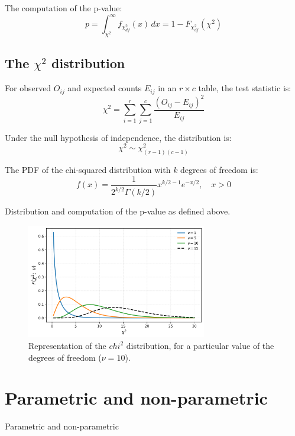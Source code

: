 \documentclass{book}
\begin{document}
The computation of the p-value:
\[
p = \int_{\chi^2}^{\infty} f_{\chi^2_{df}}(x)\,dx = 1 - F_{\chi^2_{df}}(\chi^2)
\]

\subsection*{The $\chi^{2}$ distribution}

For observed \( O_{ij} \) and expected counts \( E_{ij} \) in an \( r \times c \) table, the test statistic is:
\[
\chi^2 = \sum_{i=1}^{r} \sum_{j=1}^{c} \frac{(O_{ij} - E_{ij})^2}{E_{ij}}
\]

Under the null hypothesis of independence, the distribution is:
\[
\chi^2 \sim \chi^2_{(r-1)(c-1)}
\]

The PDF of the chi-squared distribution with \( k \) degrees of freedom is:
\[
f(x) = \frac{1}{2^{k/2} \Gamma(k/2)} x^{k/2 - 1} e^{-x/2}, \quad x > 0
\]

Distribution and computation of the p-value as defined above.

\begin{figure}[ht]
    \centering
    \includegraphics[width=0.7\textwidth]{figures/chapter4/chi2_distribution.png}
    \caption{Representation of the $chi^{2}$ distribution, for a particular value of the degrees of freedom ($\nu = 10$).}
    \label{fig:chi2_distribution}
\end{figure}

\newpage

\section{Parametric and non-parametric}

Parametric and non-parametric
\end{document}

